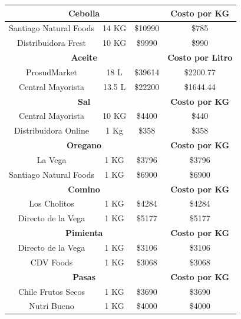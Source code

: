 \documentclass[12pt]{article}
\begin{document}
\begin{longtable}{|| c | c | c | c||}
        \multicolumn{3}{||c|}{\textbf{Cebolla}} & \textbf{Costo por KG} \\ [0.5ex] \hline \hline %
        Santiago Natural Foods & 14 KG & \$10990 & \$785 \\ \hline
        Distribuidora Frest & 10 KG & \$9990 & \$990 \\ [1ex] \hline

        \multicolumn{3}{||c|}{\textbf{Aceite}} & \textbf{Costo por Litro} \\ [0.5ex] \hline \hline
        ProsudMarket & 18 L & \$39614 & \$2200.77 \\ \hline
        Central Mayorista & 13.5 L & \$22200 & \$1644.44 \\ [1ex] \hline
        
        \multicolumn{3}{||c|}{\textbf{Sal}} & \textbf{Costo por KG} \\ [0.5ex] \hline \hline %
        Central Mayorista & 10 KG & \$4400 & \$440 \\ \hline
        Distribuidora Online & 1 Kg & \$358 & \$358 \\ [1ex] \hline \hline

        \multicolumn{3}{||c|}{\textbf{Oregano}} & \textbf{Costo por KG} \\ [0.5ex] \hline \hline %
        La Vega & 1 KG & \$3796 & \$3796 \\ \hline
        Santiago Natural Foods & 1 KG & \$6900 & \$6900 \\ [1ex] \hline \hline

        \multicolumn{3}{||c|}{\textbf{Comino}} & \textbf{Costo por KG} \\ [0.5ex] \hline \hline %
        Los Cholitos & 1 KG & \$4284 & \$4284 \\ \hline
        Directo de la Vega & 1 KG & \$5177 & \$5177 \\ [1ex] \hline \hline

        \multicolumn{3}{||c|}{\textbf{Pimienta}} & \textbf{Costo por KG} \\ [0.5ex] \hline \hline %
        Directo de la Vega & 1 KG & \$3106 & \$3106 \\ \hline
        CDV Foods & 1 KG & \$3068 & \$3068 \\ [1ex] \hline \hline

        \multicolumn{3}{||c|}{\textbf{Pasas}} & \textbf{Costo por KG} \\ [0.5ex] \hline \hline %
        Chile Frutos Secos & 1 KG & \$3690 & \$3690 \\ \hline
        Nutri Bueno & 1 KG & \$4000 & \$4000 \\ [1ex] \hline \hline



\end{longtable}
\end{document}
